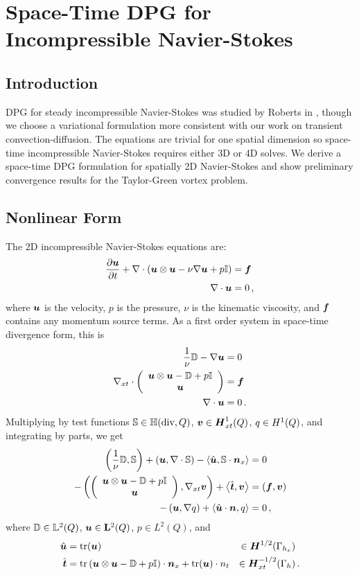 \documentclass[Dissertation.tex]{subbIles}
\begin{document}
\graphicspath{{../Figures/}}
\chapter{Space-Time DPG for Incompressible Navier-Stokes}
\label{sec:incompressible}

\section{Introduction}
DPG for steady incompressible Navier-Stokes was studied by Roberts in \cite{NateDissertation}, though
we choose a variational formulation more consistent with our work on transient convection-diffusion.
The equations are trivial for one spatial dimension so space-time incompressible
Navier-Stokes requires either 3D or 4D solves.
We derive a space-time DPG formulation for spatially 2D Navier-Stokes and show preliminary 
convergence results for the Taylor-Green vortex problem.

\section{Nonlinear Form}
The 2D incompressible Navier-Stokes equations are:
\begin{align*}
  \frac{\partial\boldsymbol u}{\partial t}+\nabla\cdot\left( \boldsymbol u\otimes\boldsymbol u-\nu\nabla\boldsymbol u+p\mathbb{I} \right)&=\boldsymbol f\\
  \nabla\cdot\boldsymbol u&=0\,,
\end{align*}
where $\boldsymbol u$ is the velocity, $p$ is the pressure, $\nu$ is the kinematic viscosity,
and $\boldsymbol f$ contains any momentum source terms.
As a first order system in space-time divergence form, this is
\begin{align*}
  \frac{1}{\nu}\mathbb{D}-\nabla\boldsymbol u&=0\\
  \nabla_{xt}\cdot\left( \begin{array}{c} \boldsymbol u\otimes\boldsymbol u-\mathbb{D}+p\mathbb{I}\\ \boldsymbol u\\ \end{array} \right)&=\boldsymbol f\\
  \nabla\cdot\boldsymbol u&=0\,.
\end{align*}
Multiplying by test functions $\mathbb{S}\in\mathbb{H}(\text{div},Q)$, $\boldsymbol v\in\mbox{\boldmath $H$}^1_{xt}(Q)$, $q\in H^{1}(Q)$, 
and integrating by parts, we get
\begin{align*}
  \left( \frac{1}{\nu}\mathbb{D},\mathbb{S} \right)
  +\left( \boldsymbol u,\nabla\cdot\mathbb{S} \right)
  -\left\langle \hat{\boldsymbol u},\mathbb{S}\cdot\boldsymbol n_x \right\rangle&=0\\
  -\left( \left( \begin{array}{c} \boldsymbol u\otimes\boldsymbol u-\mathbb{D}+p\mathbb{I}\\ \boldsymbol u\\ \end{array} \right),\nabla_{xt}\boldsymbol v \right)
  +\left\langle \hat{\boldsymbol t},\boldsymbol v \right\rangle
  &=(\boldsymbol f,\boldsymbol v)\\
  -\left( \boldsymbol u,\nabla q \right)
  +\left\langle \hat{\boldsymbol u}\cdot\boldsymbol n,q \right\rangle&=0\,,
\end{align*}
where $\mathbb{D}\in\mathbb{L}^2(Q)$, $\boldsymbol u\in\mathbf{L}^2(Q)$, $p\in L^2(Q)$, and
\begin{align*}
\hat{\boldsymbol u}&=\operatorname*{tr}(\boldsymbol u)&\in \mbox{\boldmath $H$}^{1/2}(\Gamma_{h_x})&\\
\hat{\boldsymbol t}&=\operatorname*{tr}\left( \boldsymbol u\otimes\boldsymbol u-\mathbb{D}+p\mathbb{I} \right)\cdot\boldsymbol n_x
+\operatorname*{tr}(\boldsymbol u)\cdot n_t&\in \mbox{\boldmath $H$}^{-1/2}_{xt}(\Gamma_h)&\,.
\end{align*}
\end{document}
